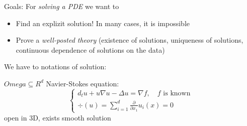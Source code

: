 \documentclass[ngerman, BCOR=5mm]{report}
\theoremstyle{tommy}
\begin{document}

Goals: For \emph{solving a PDE} we want to
\begin{itemize}
  \item Find an explizit solution! In many cases, it is impossible
  \item Prove a \emph{well-posted theory} (existence of solutions, uniqueness of solutions, continuous dependence of solutions on the data)
\end{itemize}

We have to notations of solution:

\(Omega \subseteq R^d\)
Navier-Stokes equation:
\[
  \begin{cases}
    d_t u + u \nabla u - \Delta u = \nabla f, \quad f \text{ is known} \\
    \div(u) = \sum_{i=1}^d \frac{\partial}{\partial x_1} u_i(x) = 0
  \end{cases}
\]
open in 3D, exists smooth solution
\end{document}
